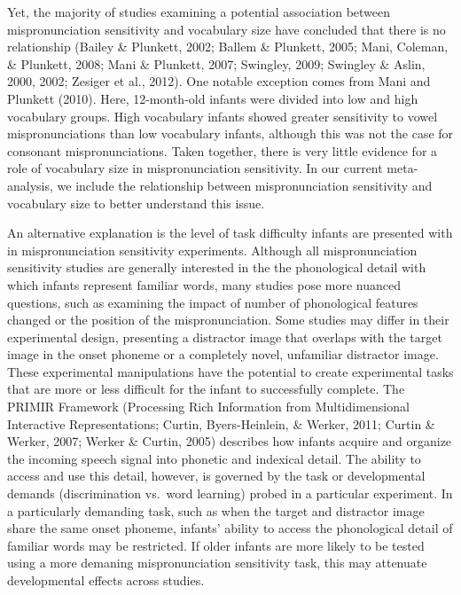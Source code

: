 \documentclass[man]{apa6}
\begin{document}
Yet, the majority of studies examining a potential association between mispronunciation sensitivity and vocabulary size have concluded that there is no relationship (Bailey \& Plunkett, 2002; Ballem \& Plunkett, 2005; Mani, Coleman, \& Plunkett, 2008; Mani \& Plunkett, 2007; Swingley, 2009; Swingley \& Aslin, 2000, 2002; Zesiger et al., 2012). One notable exception comes from Mani and Plunkett (2010). Here, 12-month-old infants were divided into low and high vocabulary groups. High vocabulary infants showed greater sensitivity to vowel mispronunciations than low vocabulary infants, although this was not the case for consonant mispronunciations. Taken together, there is very little evidence for a role of vocabulary size in mispronunciation sensitivity. In our current meta-analysis, we include the relationship between mispronunciation sensitivity and vocabulary size to better understand this issue.

An alternative explanation is the level of task difficulty infants are presented with in mispronunciation sensitivity experiments. Although all mispronunciation sensitivity studies are generally interested in the the phonological detail with which infants represent familiar words, many studies pose more nuanced questions, such as examining the impact of number of phonological features changed or the position of the mispronunciation. Some studies may differ in their experimental design, presenting a distractor image that overlaps with the target image in the onset phoneme or a completely novel, unfamiliar distractor image. These experimental manipulations have the potential to create experimental tasks that are more or less difficult for the infant to successfully complete. The PRIMIR Framework (Processing Rich Information from Multidimensional Interactive Representations; Curtin, Byers-Heinlein, \& Werker, 2011; Curtin \& Werker, 2007; Werker \& Curtin, 2005) describes how infants acquire and organize the incoming speech signal into phonetic and indexical detail. The ability to access and use this detail, however, is governed by the task or developmental demands (discrimination vs.~word learning) probed in a particular experiment. In a particularly demanding task, such as when the target and distractor image share the same onset phoneme, infants' ability to access the phonological detail of familiar words may be restricted. If older infants are more likely to be tested using a more demaning mispronunciation sensitivity task, this may attenuate developmental effects across studies.
\end{document}
